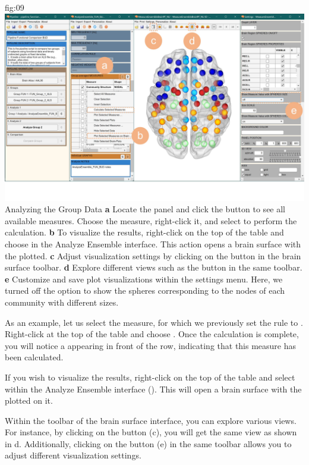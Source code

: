 \documentclass[justified]{tufte-handout}
\begin{document}
	{fig:09}
	{
	\includegraphics{fig09.jpg}
	}
	{Analyzing the Group Data}
	{
	{\bf a} Locate the  panel and click the  button to see all available measures. Choose the  measure, right-click it, and select  to perform the calculation.
	{\bf b} To visualize the results, right-click on the top of the table and choose  in the Analyze Ensemble interface. This action opens a brain surface with the  plotted.
	{\bf c} Adjust visualization settings by clicking on the  button in the brain surface toolbar.
	{\bf d} Explore different views such as the  button in the same toolbar.
	{\bf e} Customize and save plot visualizations within the settings menu. Here, we turned off the option to show the spheres corresponding to the nodes of each community with different sizes.
	}


As an example, let us select the  measure, for which we previously set the rule to . Right-click at the top of the table and choose . Once the calculation is complete, you will notice a  appearing in front of the  row, indicating that this measure has been calculated.

If you wish to visualize the results, right-click on the top of the table and select  within the Analyze Ensemble interface (). This will open a brain surface with the  plotted on it.

Within the toolbar of the brain surface interface, you can explore various views.
For instance, by clicking on the  button (c), you will get the same view as shown in d. Additionally, clicking on the  button (e) in the same toolbar allows you to adjust different visualization settings.
\end{document}
